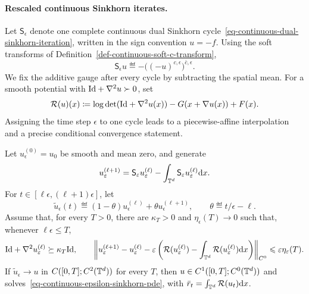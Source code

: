 \paragraph{Rescaled continuous Sinkhorn iterates.}

Let $\mathsf S_\epsilon$ denote one complete continuous dual Sinkhorn cycle~\eqref{eq-continuous-dual-sinkhorn-iteration}, written in the sign convention $u=-f$. Using the soft transforms of Definition~\ref{def-continuous-soft-c-transform},
\[
	\mathsf S_\epsilon u
	\eqdef
	-\Big((-u)^{c,\epsilon}\Big)^{\bar c,\epsilon}.
\]
We fix the additive gauge after every cycle by subtracting the spatial mean. For a smooth potential with $\mathrm{Id}+\nabla^2u\succ0$, set
\[
	\mathcal R(u)(x)
	\coloneqq
	\log\det(\mathrm{Id}+\nabla^2u(x))
	-G(x+\nabla u(x))+F(x).
\]
Assigning the time step $\epsilon$ to one cycle leads to a piecewise-affine interpolation and a precise conditional convergence statement.

\begin{prop}\label{prop-scaled-log-sinkhorn-limit}
	Let $u_\epsilon^{(0)}=u_0$ be smooth and mean zero, and generate
	\[
		u_\varepsilon^{(\ell+1)}
		=
		\mathsf S_\varepsilon u_\varepsilon^{(\ell)}
		-
		\int_{\mathbb{T}^d}\mathsf S_\varepsilon u_\varepsilon^{(\ell)}\mathrm{d} x.
	\]
	For $t\in[\ell\epsilon,(\ell+1)\epsilon]$, let
	\[
		\widetilde u_\epsilon(t)
		\eqdef
		(1-\theta)u_\epsilon^{(\ell)}
		+\theta u_\epsilon^{(\ell+1)},
		\qquad
		\theta\eqdef t/\epsilon-\ell.
	\]
	Assume that, for every $T>0$, there are $\kappa_T>0$ and $\eta_\epsilon(T)\to0$ such that, whenever $\ell\epsilon\leq T$,
	\[
		\mathrm{Id}+\nabla^2u_\varepsilon^{(\ell)}\succeq\kappa_T\mathrm{Id},
		\qquad
		\left\|
			u_\varepsilon^{(\ell+1)}-u_\varepsilon^{(\ell)}
			-\varepsilon\left(
				\mathcal R(u_\varepsilon^{(\ell)})
				-\int_{\mathbb{T}^d}\mathcal R(u_\varepsilon^{(\ell)})\mathrm{d} x
			\right)
		\right\|_{C^0}
		\leqslant
		\varepsilon\eta_\varepsilon(T).
	\]
	If $\widetilde u_\epsilon\to u$ in $C([0,T];C^2(\mathbb{T}^d))$ for every $T$, then $u\in C^1([0,T];C^0(\mathbb{T}^d))$ and solves~\eqref{eq-continuous-epsilon-sinkhorn-pde}, with
	\(
		\bar r_t=\int_{\mathbb{T}^d}\mathcal R(u_t)\mathrm{d} x
	\).
\end{prop}

